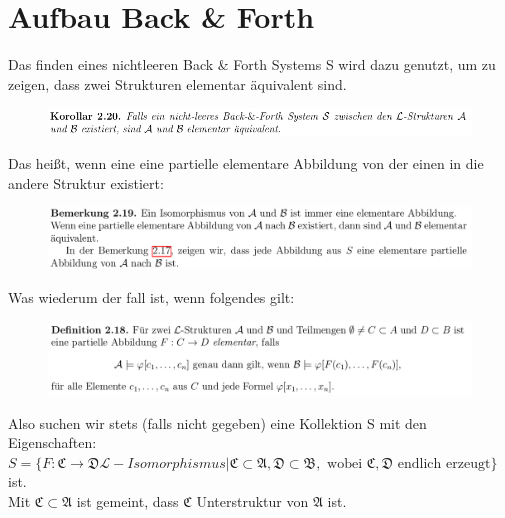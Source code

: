 \documentclass[a4paper]{scrartcl}
\begin{document}
\section*{Aufbau Back \& Forth}%
\label{sec:aufbau_back_forth}
    Das finden eines nichtleeren Back \& Forth Systems S wird dazu genutzt, um zu zeigen, dass zwei Strukturen elementar äquivalent sind.
    \begin{figure}[H]
        \centering
        \includegraphics[scale=0.6]{./B&F-EA.png}
        \label{fig:}
    \end{figure}

    Das heißt, wenn eine eine partielle elementare Abbildung von der einen in die andere Struktur existiert:
    
    \begin{figure}[H]
        \centering
        \includegraphics[scale=0.3]{./B&F-PEA.png}
        \label{fig:}
    \end{figure}

    Was wiederum der fall ist, wenn folgendes gilt:

    \begin{figure}[H]
        \centering
        \includegraphics[scale=0.3]{./B&F-E.png}
        \label{fig:}
    \end{figure}

    Also suchen wir stets (falls nicht gegeben) eine Kollektion S mit den Eigenschaften:\\

    $S = \{F: \mathfrak{C} \rightarrow \mathfrak{D} \mathscr{L}-Isomorphismus| \mathfrak{C} \subset \mathfrak{A}, \mathfrak{D} \subset \mathfrak{B},
    \text{ wobei  }\mathfrak{C}, \mathfrak{D} \text{ endlich erzeugt}\}$ ist.\\
    Mit $\mathfrak{C} \subset \mathfrak{A}$ ist gemeint, dass $\mathfrak{C}$ Unterstruktur von $\mathfrak{A}$ ist.\\
\end{document}

